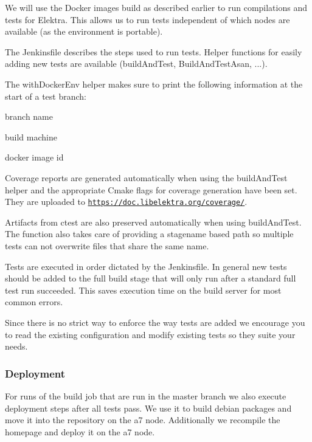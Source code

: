 We will use the Docker images build as described earlier to run compilations and tests for Elektra. This allows us to run tests independent of which nodes are available (as the environment is portable).

The Jenkinsfile describes the steps used to run tests. Helper functions for easily adding new tests are available (build\+And\+Test, Build\+And\+Test\+Asan, ...).

The {\ttfamily with\+Docker\+Env} helper makes sure to print the following information at the start of a test branch\+:


\begin{DoxyItemize}
\item branch name
\item build machine
\item docker image id
\end{DoxyItemize}

Coverage reports are generated automatically when using the build\+And\+Test helper and the appropriate Cmake flags for coverage generation have been set. They are uploaded to \href{https://doc.libelektra.org/coverage/}{\tt https\+://doc.\+libelektra.\+org/coverage/}.

Artifacts from {\ttfamily ctest} are also preserved automatically when using build\+And\+Test. The function also takes care of providing a stagename based path so multiple tests can not overwrite files that share the same name.

Tests are executed in order dictated by the Jenkinsfile. In general new tests should be added to the \textquotesingle{}full build stage\textquotesingle{} that will only run after a standard full test run succeeded. This saves execution time on the build server for most common errors.

Since there is no strict way to enforce the way tests are added we encourage you to read the existing configuration and modify existing tests so they suite your needs.

\subsubsection*{Deployment}

For runs of the build job that are run in the master branch we also execute deployment steps after all tests pass. We use it to build debian packages and move it into the repository on the a7 node. Additionally we recompile the homepage and deploy it on the a7 node.

